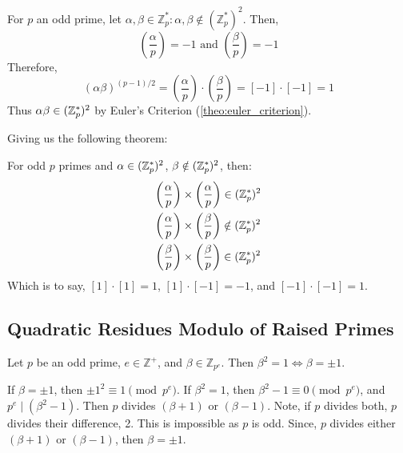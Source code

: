 \newpage

\begin{Proof} 

    For \( p \) an odd prime, let \( \alpha, \beta \in \mathbb{Z}_p^*: \alpha,\beta \notin (\mathbb{Z}_p^*)^2 \). Then,
    \[
        \left(\frac{\alpha}{p}\right) = -1 \text{ and } \left(\frac{\beta}{p}\right) = -1
    \]
    \noindent
    Therefore,
    \[
        (\alpha\beta)^{(p-1)/2}=\left(\frac{\alpha}{p}\right)\cdot\left(\frac{\beta}{p}\right) = [-1]\cdot[-1] = 1
    \]
    \noindent
    Thus $\alpha\beta\in(\mathbb{Z}_p^*)^2$ by Euler's Criterion (\ref{theo:euler_criterion}).
\end{Proof}

\noindent
Giving us the following theorem:
\begin{theo}
    
        For odd \( p \) primes and $\alpha\in(\mathbb{Z}_p^*)^2$, $\beta\notin(\mathbb{Z}_p^*)^2$, then:
        \begin{align*}
            \left(\frac{\alpha}{p}\right) &\times \left(\frac{\alpha}{p}\right)\in(\mathbb{Z}_p^*)^2  \\
            \left(\frac{\alpha}{p}\right) &\times \left(\frac{\beta}{p}\right)\notin(\mathbb{Z}_p^*)^2 \\
            \left(\frac{\beta}{p}\right) &\times \left(\frac{\beta}{p}\right)\in(\mathbb{Z}_p^*)^2
        \end{align*}
        \noindent
        Which is to say, $[1]\cdot[1]=1$, $[1]\cdot[-1]=-1$, and $[-1]\cdot[-1]=1$.
\end{theo}

\subsection{Quadratic Residues Modulo of Raised Primes}

\begin{theo}

    Let \( p \) be an odd prime, \( e\in\mathbb{Z^+}\), and \( \beta \in \mathbb{Z}_{p^e} \). 
    Then \( \beta^2 = 1 \Longleftrightarrow \beta = \pm 1 \).
\end{theo}
\begin{Proof}
    If $\beta=\pm1$, then $\pm1^2\equiv 1\pmod{p^e}$. If $\beta^2=1$, then $\beta^2-1\equiv 0\pmod{p^e}$,
    and $p^e\mid(\beta^2-1)$. Then $p$ divides $(\beta+1)$ or $(\beta-1)$. Note, if $p$ divides both, $p$ divides their difference, 2. This is impossible as $p$ is odd. Since, $p$ divides either $(\beta+1)$ or $(\beta-1)$, then $\beta=\pm1$.
\end{Proof}

